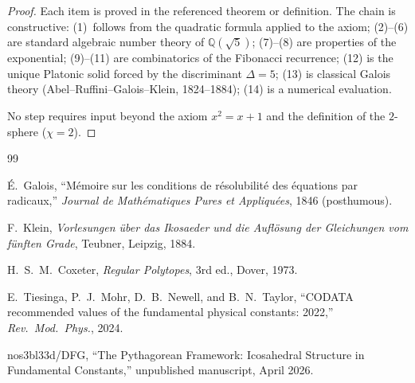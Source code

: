 \documentclass[11pt,a4paper]{article}
\theoremstyle{plain}
\theoremstyle{definition}
\newcommand{\Q}{\mathbb{Q}}
\begin{document}
\begin{proof}
Each item is proved in the referenced theorem or definition.  The chain
is constructive: (1)~follows from the quadratic formula applied to the
axiom; (2)--(6) are standard algebraic number theory of $\Q(\sqrt{5})$;
(7)--(8) are properties of the exponential; (9)--(11) are combinatorics
of the Fibonacci recurrence; (12) is the unique Platonic solid
forced by the discriminant $\Delta = 5$; (13) is classical Galois
theory (Abel--Ruffini--Galois--Klein, 1824--1884); (14) is a numerical
evaluation.

No step requires input beyond the axiom $x^{2} = x + 1$ and the
definition of the $2$-sphere ($\chi = 2$).
\end{proof}

\begin{thebibliography}{99}

\'E.~Galois, ``M\'emoire sur les conditions de r\'esolubilit\'e des
\'equations par radicaux,'' \emph{Journal de Math\'ematiques Pures et
Appliqu\'ees}, 1846 (posthumous).

F.~Klein, \emph{Vorlesungen \"uber das Ikosaeder und die Aufl\"osung der
Gleichungen vom f\"unften Grade}, Teubner, Leipzig, 1884.

H.~S.~M.~Coxeter, \emph{Regular Polytopes}, 3rd ed., Dover, 1973.

E.~Tiesinga, P.~J.~Mohr, D.~B.~Newell, and B.~N.~Taylor,
``CODATA recommended values of the fundamental physical constants: 2022,''
\emph{Rev.\ Mod.\ Phys.}, 2024.

nos3bl33d/DFG,
``The Pythagorean Framework: Icosahedral Structure in Fundamental Constants,''
unpublished manuscript, April 2026.

\end{thebibliography}
\end{document}
